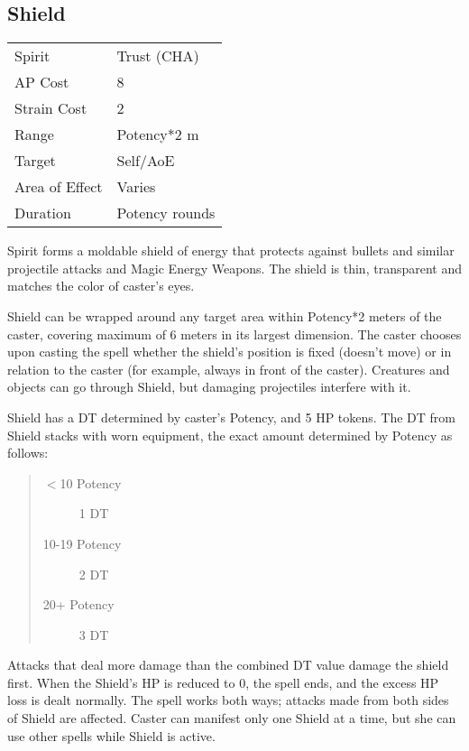 \documentclass[11pt,a4paper,twocolumn]{book}
\begin{document}
\subsection*{Shield}
{
	\begin{tabu} to 75mm{| X[l,4] | X[l,7] |}
		\hline
		Spirit 			& Trust (CHA) 		\\
		AP Cost	      	& 8 						\\
		Strain Cost     & 2 						\\
		Range     		& Potency*2	m				\\
		Target      	& Self/AoE					\\
		Area of Effect  & Varies  	 				\\
		Duration     	& Potency rounds			\\ \hline
	\end{tabu}
	
}

\medskip

Spirit forms a moldable shield of energy that protects against bullets and similar projectile attacks and Magic Energy Weapons. The shield is thin, transparent and matches the color of caster's eyes.

Shield can be wrapped around any target area within Potency*2 meters of the caster, covering maximum of 6 meters in its largest dimension. The caster chooses upon casting the spell whether the shield's position is fixed (doesn't move) or in relation to the caster (for example, always in front of the caster). Creatures and objects can go through Shield, but damaging projectiles interfere with it.

Shield has a DT determined by caster's Potency, and 5 HP tokens. The DT from Shield stacks with worn equipment, the exact amount determined by Potency as follows:
\begin{quote}
	\begin{description}
		\item[$<$10 Potency] 	1 DT
		\item[10-19 Potency]    2 DT
		\item[20+ Potency] 		3 DT
	\end{description}
\end{quote}

Attacks that deal more damage than the combined DT value damage the shield first. When the Shield's HP is reduced to 0, the spell ends, and the excess HP loss is dealt normally. The spell works both ways; attacks made from both sides of Shield are affected. Caster can manifest only one Shield at a time, but she can use other spells while Shield is active.
\end{document}

